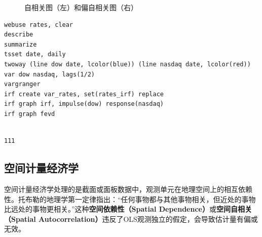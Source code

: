 \begin{figure}[htbp]
    \centering
    \caption{自相关图（左）和偏自相关图（右）}
    \label{fig:acf_pac}
\end{figure}

\begin{tcolorbox}[title=在 Stata 中应用多变量时间序列分析, colback=white, colframe=black, colbacktitle=white, coltitle=black,fonttitle=\bfseries]
\begin{lstlisting}[xleftmargin=2em, commentstyle=\color{black}]
webuse rates, clear
describe
summarize
tsset date, daily
twoway (line dow date, lcolor(blue)) (line nasdaq date, lcolor(red))
var dow nasdaq, lags(1/2)
vargranger
irf create var_rates, set(rates_irf) replace
irf graph irf, impulse(dow) response(nasdaq)
irf graph fevd
\end{lstlisting}
\vspace{-2em}
\begin{Verbatim}[commandchars=\\\{\},xleftmargin=2em]

111
\end{Verbatim}
\end{tcolorbox}

\subsection{空间计量经济学}
空间计量经济学处理的是截面或面板数据中，观测单元在地理空间上的相互依赖性。托布勒的地理学第一定律指出：“任何事物都与其他事物相关，但近处的事物比远处的事物更相关。”这种\textbf{空间依赖性（Spatial Dependence）}或\textbf{空间自相关（Spatial Autocorrelation）}违反了OLS观测独立的假定，会导致估计量有偏或无效。

